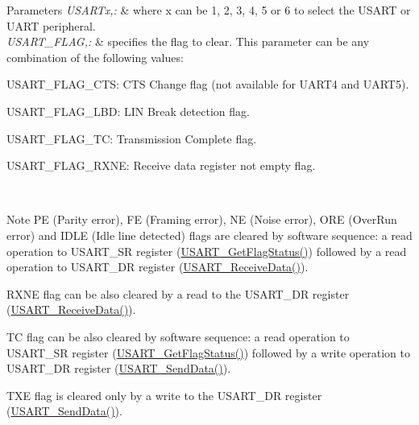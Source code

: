 \begin{DoxyParams}{Parameters}
{\em U\-S\-A\-R\-Tx,\-:} & where x can be 1, 2, 3, 4, 5 or 6 to select the U\-S\-A\-R\-T or U\-A\-R\-T peripheral. \\
\hline
{\em U\-S\-A\-R\-T\-\_\-\-F\-L\-A\-G,\-:} & specifies the flag to clear. This parameter can be any combination of the following values\-: \begin{DoxyItemize}
\item U\-S\-A\-R\-T\-\_\-\-F\-L\-A\-G\-\_\-\-C\-T\-S\-: C\-T\-S Change flag (not available for U\-A\-R\-T4 and U\-A\-R\-T5). \item U\-S\-A\-R\-T\-\_\-\-F\-L\-A\-G\-\_\-\-L\-B\-D\-: L\-I\-N Break detection flag. \item U\-S\-A\-R\-T\-\_\-\-F\-L\-A\-G\-\_\-\-T\-C\-: Transmission Complete flag. \item U\-S\-A\-R\-T\-\_\-\-F\-L\-A\-G\-\_\-\-R\-X\-N\-E\-: Receive data register not empty flag.\end{DoxyItemize}
\\
\hline
\end{DoxyParams}
\begin{DoxyNote}{Note}
P\-E (Parity error), F\-E (Framing error), N\-E (Noise error), O\-R\-E (Over\-Run error) and I\-D\-L\-E (Idle line detected) flags are cleared by software sequence\-: a read operation to U\-S\-A\-R\-T\-\_\-\-S\-R register (\hyperlink{group___u_s_a_r_t_ga144630722defc9e312f0ad280b68e9da}{U\-S\-A\-R\-T\-\_\-\-Get\-Flag\-Status()}) followed by a read operation to U\-S\-A\-R\-T\-\_\-\-D\-R register (\hyperlink{group___u_s_a_r_t_gac67a91845b0b1d54d31bdfb1c5e9867c}{U\-S\-A\-R\-T\-\_\-\-Receive\-Data()}). 

R\-X\-N\-E flag can be also cleared by a read to the U\-S\-A\-R\-T\-\_\-\-D\-R register (\hyperlink{group___u_s_a_r_t_gac67a91845b0b1d54d31bdfb1c5e9867c}{U\-S\-A\-R\-T\-\_\-\-Receive\-Data()}). 

T\-C flag can be also cleared by software sequence\-: a read operation to U\-S\-A\-R\-T\-\_\-\-S\-R register (\hyperlink{group___u_s_a_r_t_ga144630722defc9e312f0ad280b68e9da}{U\-S\-A\-R\-T\-\_\-\-Get\-Flag\-Status()}) followed by a write operation to U\-S\-A\-R\-T\-\_\-\-D\-R register (\hyperlink{group___u_s_a_r_t_ga0b43d42da9540f446d494bf69823c6fb}{U\-S\-A\-R\-T\-\_\-\-Send\-Data()}). 

T\-X\-E flag is cleared only by a write to the U\-S\-A\-R\-T\-\_\-\-D\-R register (\hyperlink{group___u_s_a_r_t_ga0b43d42da9540f446d494bf69823c6fb}{U\-S\-A\-R\-T\-\_\-\-Send\-Data()}).
\end{DoxyNote}

